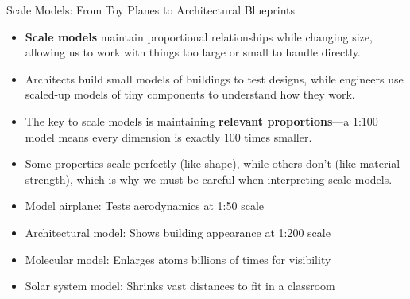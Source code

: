 \documentclass{beamer}
\begin{document}
	\begin{frame}{Scale Models: From Toy Planes to Architectural Blueprints}
		\begin{itemize}
			\item \textbf{Scale models} maintain proportional relationships while changing size, allowing us to work with things too large or small to handle directly.
			\item Architects build small models of buildings to test designs, while engineers use scaled-up models of tiny components to understand how they work.
			\item The key to scale models is maintaining \textbf{relevant proportions}—a 1:100 model means every dimension is exactly 100 times smaller.
			\item Some properties scale perfectly (like shape), while others don't (like material strength), which is why we must be careful when interpreting scale models.
		\end{itemize}
		
		\begin{example}
			\begin{itemize}
				\item Model airplane: Tests aerodynamics at 1:50 scale
				\item Architectural model: Shows building appearance at 1:200 scale
				\item Molecular model: Enlarges atoms billions of times for visibility
				\item Solar system model: Shrinks vast distances to fit in a classroom
			\end{itemize}
		\end{example}
	\end{frame}
	
\end{document}
